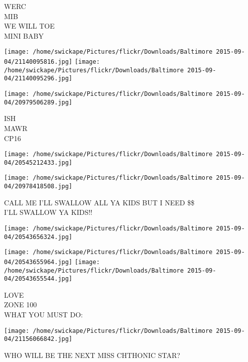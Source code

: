 \documentclass[10pt,letterpaper]{article}
\begin{document}
WERC\\
MIB\\
WE WILL TOE\\
MINI BABY\\
\pagebreak

\texttt{[image: /home/swickape/Pictures/flickr/Downloads/Baltimore 2015-09-04/21140095816.jpg]}
\texttt{[image: /home/swickape/Pictures/flickr/Downloads/Baltimore 2015-09-04/21140095296.jpg]}

\vspace{0.25in}
\texttt{[image: /home/swickape/Pictures/flickr/Downloads/Baltimore 2015-09-04/20979506289.jpg]}

ISH\\
MAWR\\
CP16\\
\pagebreak

\texttt{[image: /home/swickape/Pictures/flickr/Downloads/Baltimore 2015-09-04/20545212433.jpg]}

\vspace{0.25in}
\texttt{[image: /home/swickape/Pictures/flickr/Downloads/Baltimore 2015-09-04/20978418508.jpg]}

CALL ME I'LL SWALLOW ALL YA KIDS BUT I NEED \$\$\\
I'LL SWALLOW YA KIDS!!\\
\pagebreak

\texttt{[image: /home/swickape/Pictures/flickr/Downloads/Baltimore 2015-09-04/20543656324.jpg]}

\vspace{0.25in}
\texttt{[image: /home/swickape/Pictures/flickr/Downloads/Baltimore 2015-09-04/20543655964.jpg]}
\texttt{[image: /home/swickape/Pictures/flickr/Downloads/Baltimore 2015-09-04/20543655544.jpg]}

LOVE\\
ZONE 100\\
WHAT YOU MUST DO:\\
\pagebreak

\texttt{[image: /home/swickape/Pictures/flickr/Downloads/Baltimore 2015-09-04/21156066842.jpg]}

WHO WILL BE THE NEXT MISS CHTHONIC STAR?\\
\pagebreak
\end{document}
